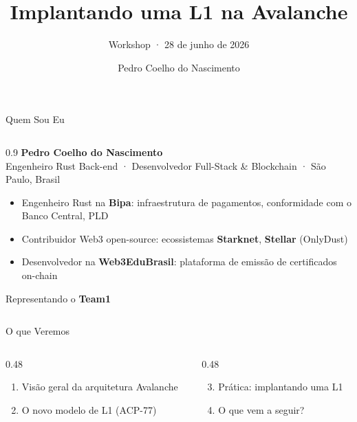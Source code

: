 \documentclass[aspectratio=169]{beamer}
\title{Implantando uma L1 na Avalanche}
\subtitle{Workshop · 28 de junho de 2026}
\author{Pedro Coelho do Nascimento}
\institute{Team1}
\date{}
\begin{document}

\begin{frame}[plain]
	\titlepage
\end{frame}

\begin{frame}{Quem Sou Eu}
	\begin{columns}[c]
		\begin{column}{0.9\textwidth}
			{\large\textbf{Pedro Coelho do Nascimento}}\\[0.2em]
			{\small\textcolor{avagraydark}{Engenheiro Rust Back-end · Desenvolvedor Full-Stack \& Blockchain · São Paulo, Brasil}}

			\vspace{0.8em}
			\begin{itemize}
				\item Engenheiro Rust na \textbf{Bipa}: infraestrutura de pagamentos, conformidade com o Banco Central, PLD
				\item Contribuidor Web3 open-source: ecossistemas \textbf{Starknet}, \textbf{Stellar} (OnlyDust)
				\item Desenvolvedor na \textbf{Web3EduBrasil}: plataforma de emissão de certificados on-chain
			\end{itemize}

			\vspace{0.8em}
			{\small Representando o \textbf{Team1}}
		\end{column}
	\end{columns}
\end{frame}

\begin{frame}{O que Veremos}
	\begin{columns}[t]
		\begin{column}{0.48\textwidth}
			\begin{enumerate}
				\item Visão geral da arquitetura Avalanche
				\item O novo modelo de L1 (ACP-77)
			\end{enumerate}
		\end{column}
		\begin{column}{0.48\textwidth}
			\begin{enumerate}
				\setcounter{enumi}{2}
				\item Prática: implantando uma L1
				\item O que vem a seguir?
			\end{enumerate}
		\end{column}
	\end{columns}
\end{frame}
\end{document}
